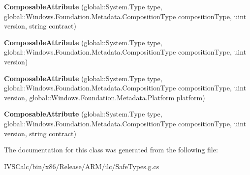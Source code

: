 \begin{DoxyCompactItemize}
\item 
\mbox{\label{class_windows_1_1_foundation_1_1_metadata_1_1_composable_attribute_af1f14e4b9b6a4de568817fdeb25c51b5}} 
{\bfseries Composable\+Attribute} (global\+::\+System.\+Type type, global\+::\+Windows.\+Foundation.\+Metadata.\+Composition\+Type composition\+Type, uint version, string contract)
\item 
\mbox{\label{class_windows_1_1_foundation_1_1_metadata_1_1_composable_attribute_a9698d1ccfc15873da70639d7c273f978}} 
{\bfseries Composable\+Attribute} (global\+::\+System.\+Type type, global\+::\+Windows.\+Foundation.\+Metadata.\+Composition\+Type composition\+Type, uint version)
\item 
\mbox{\label{class_windows_1_1_foundation_1_1_metadata_1_1_composable_attribute_ac7f7df8b8f0df32c124854576b18bd79}} 
{\bfseries Composable\+Attribute} (global\+::\+System.\+Type type, global\+::\+Windows.\+Foundation.\+Metadata.\+Composition\+Type composition\+Type, uint version, global\+::\+Windows.\+Foundation.\+Metadata.\+Platform platform)
\item 
\mbox{\label{class_windows_1_1_foundation_1_1_metadata_1_1_composable_attribute_af1f14e4b9b6a4de568817fdeb25c51b5}} 
{\bfseries Composable\+Attribute} (global\+::\+System.\+Type type, global\+::\+Windows.\+Foundation.\+Metadata.\+Composition\+Type composition\+Type, uint version, string contract)
\end{DoxyCompactItemize}


The documentation for this class was generated from the following file\+:\begin{DoxyCompactItemize}
\item 
I\+V\+S\+Calc/bin/x86/\+Release/\+A\+R\+M/ilc/Safe\+Types.\+g.\+cs\end{DoxyCompactItemize}
